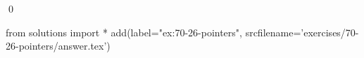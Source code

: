 
\begin{ex}
  \label{ex:70-26-pointers}
  
  \qed
\end{ex}
\begin{python0}
from solutions import *
add(label="ex:70-26-pointers",
    srcfilename='exercises/70-26-pointers/answer.tex')
\end{python0}
